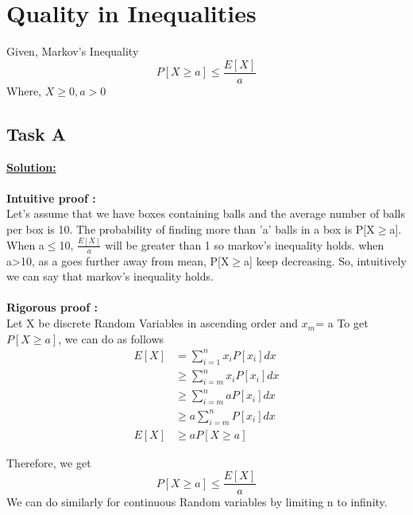 \documentclass[12pt]{article}
\begin{document}
\section{Quality in Inequalities}
Given, Markov's Inequality
\begin{equation}
    P[X \geq a] \leq \frac{E[X]}{a}
\end{equation}
Where, 
    $X \geq 0, a>0$
\subsection{Task A}
\textbf{\underline{Solution:}}\\
\\
\textbf{Intuitive proof :}\\
    Let's assume that we have  boxes containing balls and the average number of balls per box is 10. The probability of finding more than 'a' balls in a box is P[X$\geq$a]. When a$\leq$10, $\frac{E[X]}{a}$ will be greater than 1 so markov's inequality holds. when a>10, as a goes further away from mean, P[X$\geq$a] keep decreasing. So, intuitively we can say that markov's inequality holds. \\
\\
\textbf{Rigorous proof :}\\
Let X be discrete Random Variables in ascending order and $x_m$= a 
To get $P[X\geq a]$, we can do as follows
\begin{equation}
\begin{split}
    E[X]& = \sum_{i=1}^{n}x_iP[x_i]dx \\
    & \geq \sum_{i=m}^{n}x_iP[x_i]dx \\
    & \geq \sum_{i=m}^{n}aP[x_i]dx \\
    & \geq a\sum_{i=m}^{n}P[x_i]dx \\
    E[X]& \geq aP[X\geq a]
\end{split}
\end{equation}

Therefore, we get
\begin{equation}
    P[X \geq a] \leq \frac{E[X]}{a}
\end{equation}
We can do similarly for continuous Random variables by limiting n to infinity.
\end{document}
